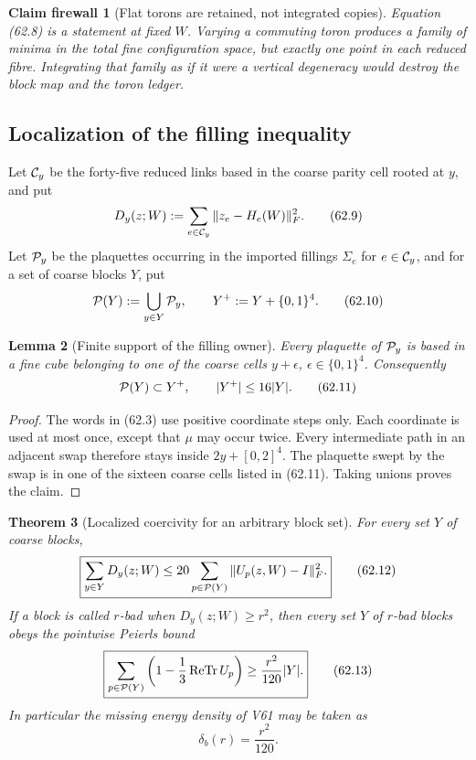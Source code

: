 \documentclass[11pt,oneside]{book}
\newtheorem{theorem}{Theorem}[chapter]
\newtheorem{lemma}[theorem]{Lemma}
\newtheorem{firewall}[theorem]{Claim firewall}
\theoremstyle{definition}
\theoremstyle{remark}
\begin{document}
\begin{firewall}[Flat torons are retained, not integrated copies]
\label{fire:e8v62-toron-zero}
Equation (62.8) is a statement at fixed \(W\).  Varying a commuting
toron produces a family of minima in the total fine configuration
space, but exactly one point in each reduced fibre.  Integrating that
family as if it were a vertical degeneracy would destroy the block
map and the toron ledger.
\end{firewall}

\subsection{Localization of the filling inequality}

Let \({\cal C}_y\) be the forty-five reduced links based in the
coarse parity cell rooted at \(y\), and put
\[
 D_y(z;W):=\sum_{e\in{\cal C}_y}
             \|z_e-H_e(W)\|_F^2.                             \tag{62.9}
\]
Let \({\cal P}_y\) be the plaquettes occurring in the imported
fillings \(\Sigma_e\) for \(e\in{\cal C}_y\), and for a set of
coarse blocks \(Y\), put
\[
 {\cal P}(Y):=\bigcup_{y\in Y}{\cal P}_y,\qquad
 Y^+:=Y+\{0,1\}^4.                                          \tag{62.10}
\]

\begin{lemma}[Finite support of the filling owner]
\label{lem:e8v62-filling-support}
Every plaquette of \({\cal P}_y\) is based in a fine cube belonging
to one of the coarse cells \(y+\epsilon\),
\(\epsilon\in\{0,1\}^4\).  Consequently
\[
 {\cal P}(Y)\subset Y^+,\qquad |Y^+|\le16|Y|.               \tag{62.11}
\]
\end{lemma}

\begin{proof}
The words in (62.3) use positive coordinate steps only.  Each
coordinate is used at most once, except that \(\mu\) may occur
twice.  Every intermediate path in an adjacent swap therefore stays
inside \(2y+[0,2]^4\).  The plaquette swept by the swap is in one of
the sixteen coarse cells listed in (62.11).  Taking unions proves
the claim.
\end{proof}

\begin{theorem}[Localized coercivity for an arbitrary block set]
\label{thm:e8v62-local-coercivity}
For every set \(Y\) of coarse blocks,
\[
 \boxed{
 \sum_{y\in Y}D_y(z;W)
 \le20\sum_{p\in{\cal P}(Y)}\|U_p(z,W)-I\|_F^2.}             \tag{62.12}
\]
If a block is called \(r\)-bad when \(D_y(z;W)\ge r^2\), then
every set \(Y\) of \(r\)-bad blocks obeys the pointwise Peierls
bound
\[
 \boxed{
 \sum_{p\in{\cal P}(Y)}
 \left(1-\frac13\operatorname{ReTr}U_p\right)
 \ge\frac{r^2}{120}|Y|.}                                    \tag{62.13}
\]
In particular the missing energy density of V61 may be taken as
\[
                         \delta_b(r)=\frac{r^2}{120}.         \tag{62.14}
\]
\end{theorem}
\end{document}
